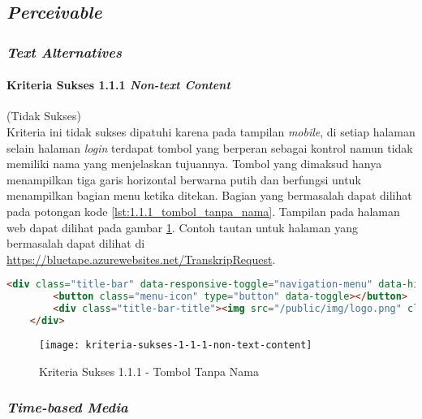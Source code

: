 \subsection{\textit{Perceivable}}
\label{subsec:kepatuhan_bluetape_perceivable}

\subsubsection{\textit{Text Alternatives}}
\label{subsubsec:kepatuhan_bluetape_text_alternatives}

\paragraph{Kriteria Sukses 1.1.1 \textit{Non-text Content}}
\label{par:kepatuhan_bluetape_kriteria_sukses_1.1.1}
(Tidak Sukses)\\

Kriteria ini tidak sukses dipatuhi karena pada tampilan \textit{mobile}, di setiap halaman selain halaman \textit{login} terdapat tombol yang berperan sebagai kontrol namun tidak memiliki nama yang menjelaskan tujuannya. Tombol yang dimaksud hanya menampilkan tiga garis horizontal berwarna putih dan berfungsi untuk menampilkan bagian menu ketika ditekan. Bagian yang bermasalah dapat dilihat pada potongan kode \ref{lst:1.1.1_tombol_tanpa_nama}. Tampilan pada halaman web dapat dilihat pada gambar \ref{fig:1.1.1_non_text_content}. Contoh tautan untuk halaman yang bermasalah dapat dilihat di \url{https://bluetape.azurewebsites.net/TranskripRequest}.

\begin{lstlisting}[frame=single, label={lst:1.1.1_tombol_tanpa_nama}, language=HTML, caption=Kriteria Sukses 1.1.1 - Tombol Tanpa Nama]
    <div class="title-bar" data-responsive-toggle="navigation-menu" data-hide-for="medium">
        <button class="menu-icon" type="button" data-toggle></button>
        <div class="title-bar-title"><img src="/public/img/logo.png" class="textsized" alt="B"/></div>
    </div>
\end{lstlisting}

\begin{figure}[H]
    \centering  
    \texttt{[image: kriteria-sukses-1-1-1-non-text-content]}  
    \caption[Kriteria Sukses 1.1.1 - Tombol Tanpa Nama]{Kriteria Sukses 1.1.1 - Tombol Tanpa Nama}
    \label{fig:1.1.1_non_text_content}  
\end{figure} 

\subsubsection{\textit{Time-based Media}}
\label{subsubsec:kepatuhan_bluetape_time_based_media}


